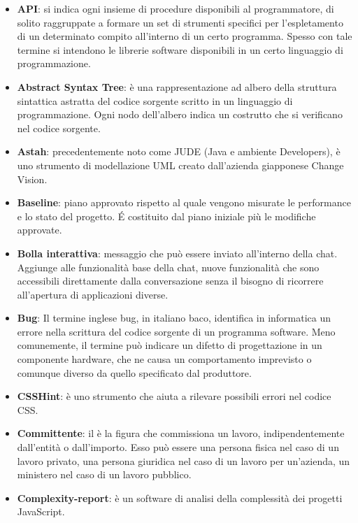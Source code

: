 \begin{itemize}
\item[] \textbf{API}: si indica ogni insieme di procedure disponibili al programmatore, di solito raggruppate a formare un set di strumenti specifici per l'espletamento di un determinato compito all'interno di un certo programma. Spesso con tale termine si intendono le librerie software disponibili in un certo linguaggio di programmazione.
\item[] \textbf{Abstract Syntax Tree}: è una rappresentazione ad albero della struttura sintattica astratta del codice sorgente scritto in un linguaggio di programmazione. Ogni nodo dell'albero indica un costrutto che si verificano nel codice sorgente.
\item[] \textbf{Astah}: precedentemente noto come JUDE (Java e ambiente  Developers), è uno strumento di modellazione UML creato dall'azienda giapponese Change Vision.
\end{itemize}
\newpage

\begin{itemize}
\item[] \textbf{Baseline}: piano approvato rispetto al quale vengono misurate le performance e lo stato del progetto. \'E costituito dal piano iniziale più le modifiche approvate.
\item[] \textbf{Bolla interattiva}: messaggio che può essere inviato all'interno della chat. Aggiunge alle funzionalità base della chat, nuove funzionalità che sono accessibili direttamente dalla conversazione senza il bisogno di ricorrere all'apertura di applicazioni diverse.
\item[] \textbf{Bug}: Il termine inglese bug, in italiano baco, identifica in informatica un errore nella scrittura del codice sorgente di un programma software. Meno comunemente, il termine  può indicare un difetto di progettazione in un componente hardware, che ne causa un comportamento imprevisto o comunque diverso da quello specificato dal produttore.
\end{itemize}
\newpage

\begin{itemize}
\item[] \textbf{CSSHint}: è uno strumento che aiuta a rilevare possibili errori nel codice CSS.
\item[] \textbf{Committente}: il  è la figura che commissiona un lavoro, indipendentemente dall'entità o dall'importo. Esso può essere una persona fisica nel caso di un lavoro privato, una persona giuridica nel caso di un lavoro per un'azienda, un ministero nel caso di un lavoro pubblico.
\item[] \textbf{Complexity-report}: è un software di analisi della complessità dei progetti JavaScript.
\end{itemize}
\newpage

